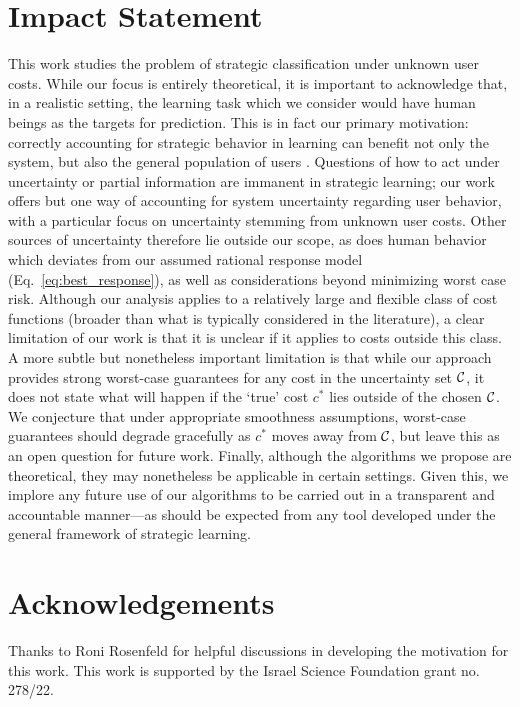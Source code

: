 \documentclass{article}
\newcommand{\costset}{\gC}
\newcommand{\costfunc}{c}
\theoremstyle{definition}
\begin{document}
\section*{Impact Statement}
This work studies the problem of strategic classification under unknown user costs.
While our focus is entirely theoretical,
it is important to acknowledge that,
in a realistic setting, 
the learning task which we consider would have human beings as the targets for prediction.
This is in fact our primary motivation:
correctly accounting for strategic behavior in learning can benefit not only the system, but also the general population of users \citep{milli2019social,levanon2021strategic,levanon2022generalized}.
Questions of how to act under uncertainty or partial information are immanent in strategic learning;
our work offers but one way of accounting for system uncertainty regarding user behavior, with a particular focus on uncertainty stemming from unknown user costs.
Other sources of uncertainty therefore lie outside our scope,
as does human behavior which deviates from our assumed rational response model (Eq.~\eqref{eq:best_response}),
as well as considerations beyond minimizing worst case risk.
Although our analysis applies to a relatively large and flexible class of cost functions (broader than what is typically considered in the literature),
a clear limitation of our work is that it is unclear if it applies to costs outside this class.
A more subtle but nonetheless important limitation is that while our approach provides strong worst-case guarantees for any cost in the uncertainty set $\costset$, it does not state what will happen if the `true' cost $\costfunc^*$ lies outside of the chosen $\costset$.
We conjecture that under appropriate smoothness assumptions, worst-case guarantees should degrade gracefully as $\costfunc^*$ moves away from $\costset$,
but leave this as an open question for future work.
Finally, although the algorithms we propose are theoretical,
they may nonetheless be applicable in certain settings.
Given this, we implore any future use of our algorithms to be carried out in a transparent and accountable manner---as should be expected from any tool developed under the general framework of strategic learning.

\section*{Acknowledgements}
Thanks to Roni Rosenfeld for helpful discussions in developing the motivation for this work. This work is supported by the Israel Science Foundation grant no. 278/22.


\clearpage



\clearpage
\onecolumn

\appendix

\end{document}

